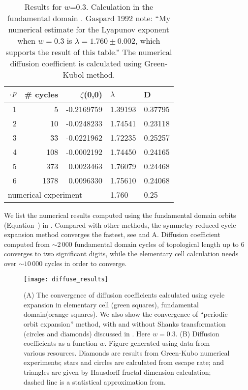 \begin{table}[htbp]
	\centering
	\begin{tabular}{|r|r|r|l|l|}
		\hline
		$\period{p}$ & \# cycles & $\zeta$(0,0) & $\lambda$ & D \\ 
		\hline\hline
		1      & 5      & -0.2169759 & 1.39193 & 0.37795 \\
		2      & 10     & -0.0248233 & 1.74541 & 0.23118 \\
		3      & 33     & -0.0221962 & 1.72235 & 0.25257 \\
		4      & 108    & -0.0002192 & 1.74450 & 0.24165 \\
		5      & 373    &  0.0023463 & 1.76079 & 0.24468 \\
		6      & 1378   &  0.0096330 & 1.75610 & 0.24068 \\ 
		\hline\hline
		\multicolumn{3}{|l|}{numerical experiment}
		& 1.760   & 0.25
		\\ \hline
	\end{tabular}
	\caption[Fundamental domain cycle expansion results of diffusion 
	coefficient]{\label{TCELL2}
		Results for $w$=0.3. Calculation in the fundamental domain . 
		Gaspard 
		1992 note: ``My
		numerical estimate for the Lyapunov exponent when $w=0.3$ is
		$\lambda = 1.760 \pm 0.002$, which supports the result of this
		table.'' The numerical diffusion coefficient is calculated 
		using 
		Green-Kubol method. 
	}
\end{table}

We list the numerical results computed using the fundamental domain
orbits (Equation~) in . Compared with
other methods, the symmetry-reduced cycle expansion method converges
the fastest, see  and A. Diffusion
coefficient computed from $\sim2\,000$ fundamental domain cycles of
topological length up to 6 converges to two significant digits, while
the elementary cell calculation needs over $\sim 10\,000$ cycles in
order to converge.

\begin{figure}
	\texttt{[image: diffuse\_results]}
	\caption[Diffusion coefficients computed using cycle expansion 
	formulas]{\label{fig-results} 
		(A) The convergence of diffusion coefficients  calculated 
		using cycle
		expansion in elementary cell (green squares),  fundamental
		domain(orange squares). We  also show the convergence of 
		``periodic
		orbit expansion'' method, with and  without Shanks 
		transformation
		(circles and diamonds) discussed in  . 
		Here $w =
		0.3$. (B) Diffusion coefficients as a function $w$.  Figure
		generated using data from various resources. Diamonds are 
		results
		from  Green-Kubo numerical experiments;
		stars and  circles are calculated 
		from
		escape rate; and triangles are  given by Hausdorff fractal 
		dimension
		calculation; dashed line  is a statistical
		approximation from.}
\end{figure}


